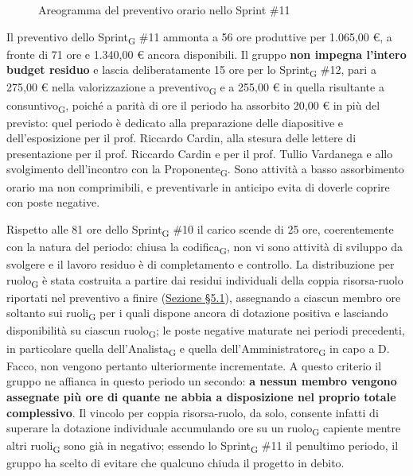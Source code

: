﻿\documentclass[a4paper, 10pt, colorlinks=true, linkcolor=black, urlcolor=blue, citecolor=blue, hidelinks]{article}
\begin{document}
\begin{figure}[H]

\caption{Areogramma del preventivo orario nello Sprint \#11}
\label{fig:preventivo-sprint11}
\end{figure}

Il preventivo dello Sprint\textsubscript{G} \#11 ammonta a 56 ore produttive per 1.065,00 €, a fronte di 71 ore e 1.340,00 € ancora disponibili. Il gruppo \textbf{non impegna l'intero budget residuo} e lascia deliberatamente 15 ore per lo Sprint\textsubscript{G} \#12, pari a 275,00 € nella valorizzazione a preventivo\textsubscript{G} e a 255,00 € in quella risultante a consuntivo\textsubscript{G}, poiché a parità di ore il periodo ha assorbito 20,00 € in più del previsto: quel periodo è dedicato alla preparazione delle diapositive e dell'esposizione per il prof. Riccardo Cardin, alla stesura delle lettere di presentazione per il prof. Riccardo Cardin e per il prof. Tullio Vardanega e allo svolgimento dell'incontro con la Proponente\textsubscript{G}. Sono attività a basso assorbimento orario ma non comprimibili, e preventivarle in anticipo evita di doverle coprire con poste negative.

Rispetto alle 81 ore dello Sprint\textsubscript{G} \#10 il carico scende di 25 ore, coerentemente con la natura del periodo: chiusa la codifica\textsubscript{G}, non vi sono attività di sviluppo da svolgere e il lavoro residuo è di completamento e controllo. La distribuzione per ruolo\textsubscript{G} è stata costruita a partire dai residui individuali della coppia risorsa-ruolo riportati nel preventivo a finire (\hyperref[tab:preventivo-finire]{Sezione \S5.1}), assegnando a ciascun membro ore soltanto sui ruoli\textsubscript{G} per i quali dispone ancora di dotazione positiva e lasciando disponibilità su ciascun ruolo\textsubscript{G}; le poste negative maturate nei periodi precedenti, in particolare quella dell'Analista\textsubscript{G} e quella dell'Amministratore\textsubscript{G} in capo a D. Facco, non vengono pertanto ulteriormente incrementate. A questo criterio il gruppo ne affianca in questo periodo un secondo: \textbf{a nessun membro vengono assegnate più ore di quante ne abbia a disposizione nel proprio totale complessivo}. Il vincolo per coppia risorsa-ruolo, da solo, consente infatti di superare la dotazione individuale accumulando ore su un ruolo\textsubscript{G} capiente mentre altri ruoli\textsubscript{G} sono già in negativo; essendo lo Sprint\textsubscript{G} \#11 il penultimo periodo, il gruppo ha scelto di evitare che qualcuno chiuda il progetto in debito.
\end{document}
